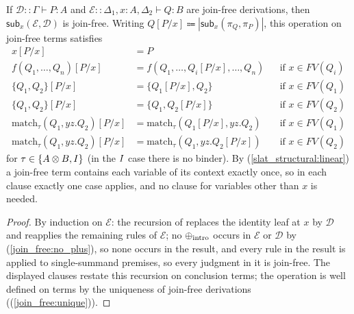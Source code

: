 \begin{lemma}
\label{lemma:join_free_subst}
If $\mathcal{D} :: \Gamma \vdash P : A$ and $\mathcal{E} :: \Delta_1, x : A, \Delta_2 \vdash Q : B$ are join-free derivations, then $\mathsf{sub}_x(\mathcal{E}, \mathcal{D})$ is join-free.
Writing $Q[P/x] \Coloneqq |\mathsf{sub}_x(\pi_Q, \pi_P)|$, this operation on join-free terms satisfies
\begin{align*}
x[P/x] &= P\\
f(Q_1, \ldots, Q_n)[P/x] &= f(Q_1, \ldots, Q_i[P/x], \ldots, Q_n) &&\text{if } x \in FV(Q_i)\\
\{Q_1, Q_2\}[P/x] &= \{Q_1[P/x], Q_2\} &&\text{if } x \in FV(Q_1)\\
\{Q_1, Q_2\}[P/x] &= \{Q_1, Q_2[P/x]\} &&\text{if } x \in FV(Q_2)\\
\text{match}_{\tau}(Q_1, yz.Q_2)[P/x] &= \text{match}_{\tau}(Q_1[P/x], yz.Q_2) &&\text{if } x \in FV(Q_1)\\
\text{match}_{\tau}(Q_1, yz.Q_2)[P/x] &= \text{match}_{\tau}(Q_1, yz.Q_2[P/x]) &&\text{if } x \in FV(Q_2)
\end{align*}
for $\tau \in \{A \otimes B, I\}$ (in the $I$ case there is no binder).
By (\ref{slat_structural:linear}) a join-free term contains each variable of its context exactly once, so in each clause exactly one case applies, and no clause for variables other than $x$ is needed.
\end{lemma}
\begin{proof}
By induction on $\mathcal{E}$: the recursion of  replaces the identity leaf at $x$ by $\mathcal{D}$ and reapplies the remaining rules of $\mathcal{E}$; no $\mathbin{\oplus}_{\text{intro}}$ occurs in $\mathcal{E}$ or $\mathcal{D}$ by (\ref{join_free:no_plus}), so none occurs in the result, and every rule in the result is applied to single-summand premises, so every judgment in it is join-free.
The displayed clauses restate this recursion on conclusion terms; the operation is well defined on terms by the uniqueness of join-free derivations ((\ref{join_free:unique})).
\end{proof}


